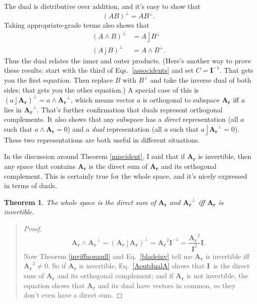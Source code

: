 \documentclass{utarticle}
\newcommand{\bl}[1]{\ensuremath{\bm{#1}}}
\newcommand{\I}{\bl{I}}
\DeclareMathOperator{\lin}{\rfloor}
\DeclareMathOperator{\out}{\wedge}
\newcommand{\dual}[1]{\ensuremath{#1^\perp}}
\newtheorem{thm}{Theorem}
\newcommand{\bp}{\begin{quotation} \begin{proof}}
\newcommand{\ep}{\end{proof} \end{quotation}}
\begin{document}
The dual is distributive over addition, and it's easy to show that
\begin{equation} \dual{(AB)} = A\dual{B}. \end{equation}
Taking appropriate-grade terms also shows that
\begin{align}
\dual{(A \out B)} & = A \lin \dual{B} \nonumber \\
\dual{(A \lin B)} & = A \out \dual{B}.
\label{dualprods}
\end{align} 
Thus the dual relates the inner and outer products.  (Here's another way to prove these results:  
start with the third of Eqs.~\eqref{associdents} and set $C=\I^{-1}$.  That gets you the first equation. 
Then replace $B$ with $\dual{B}$ and take the inverse dual of both sides; that gets you the other 
equation.)  A special case of this is $\dual{(a \lin \bl{A_r})} = a \out \dual{\bl{A_r}}$, which means 
vector $a$ is orthogonal to subspace \bl{A_r} iff $a$ lies in \dual{\bl{A_r}}.  That's further confirmation 
that duals represent orthogonal complements.  It also shows that any subspace has a \emph{direct}
representation (all $a$ such that $a \out \bl{A_r} = 0$) and a \emph{dual} representation (all $a$
such that $a \lin \dual{\bl{A_r}} = 0$).  These two representations are both useful in different situations.

In the discussion around Theorem \ref{miscident}, I said that if \bl{A_r} is invertible, 
then any space that contains \bl{A_r} is the direct sum of \bl{A_r} and its orthogonal 
complement.  This is certainly true for the whole space, and it's nicely expressed in 
terms of duals.
\begin{thm}
The whole space is the direct sum of \bl{A_r} and \dual{\bl{A_r}} iff \bl{A_r} 
is invertible.
\label{Aandorthspan}
\end{thm}
\bp
\begin{equation}
\bl{A_r} \out \dual{\bl{A_r}} = \dual{(\bl{A_r} \lin \bl{A_r})} = \bl{A_r}^2 \I^{-1} = \frac{\bl{A_r}^2}{\I^2} \I.
\label{AoutdualA}
\end{equation}
Now Theorem \ref{inviffnonnull} and Eq.~\eqref{bladeinv} tell me \bl{A_r} is invertible iff 
$\bl{A_r}^2 \neq 0$.  So if \bl{A_r} is invertible, Eq.~\eqref{AoutdualA} shows that \I\ is the 
direct sum of \bl{A_r} and its orthogonal complement; and if \bl{A_r} is not invertible, the 
equation shows that \bl{A_r} and its dual have vectors in common, so they don't even 
have a direct sum.
\ep
\end{document}
